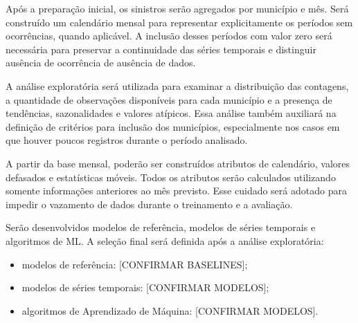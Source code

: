 \documentclass[12pt]{article}
\begin{document}
Após a preparação inicial, os sinistros serão agregados por município e mês. Será construído um calendário mensal para representar explicitamente os períodos sem ocorrências, quando aplicável. A inclusão desses períodos com valor zero será necessária para preservar a continuidade das séries temporais e distinguir ausência de ocorrência de ausência de dados.

A análise exploratória será utilizada para examinar a distribuição das contagens, a quantidade de observações disponíveis para cada município e a presença de tendências, sazonalidades e valores atípicos. Essa análise também auxiliará na definição de critérios para inclusão dos municípios, especialmente nos casos em que houver poucos registros durante o período analisado.

A partir da base mensal, poderão ser construídos atributos de calendário, valores defasados e estatísticas móveis. Todos os atributos serão calculados utilizando somente informações anteriores ao mês previsto. Esse cuidado será adotado para impedir o vazamento de dados durante o treinamento e a avaliação.

Serão desenvolvidos modelos de referência, modelos de séries temporais e algoritmos de ML. A seleção final será definida após a análise exploratória:

\begin{itemize}
    \item modelos de referência: [CONFIRMAR BASELINES];
    \item modelos de séries temporais: [CONFIRMAR MODELOS];
    \item algoritmos de Aprendizado de Máquina: [CONFIRMAR MODELOS].
\end{itemize}

\nocite{*}


\end{document}
